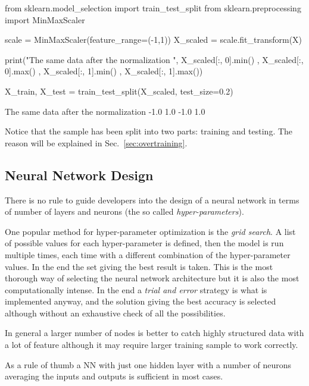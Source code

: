 \begin{ipython}
from sklearn.model_selection import train_test_split
from sklearn.preprocessing import MinMaxScaler

scale = MinMaxScaler(feature_range=(-1,1))
X_scaled = scale.fit_transform(X)

print("The same data after the normalization ", X_scaled[:, 0].min()
                                              , X_scaled[:, 0].max()
                                              , X_scaled[:, 1].min()
                                              , X_scaled[:, 1].max())

X_train, X_test = train_test_split(X_scaled, test_size=0.2)
\end{ipython}
\begin{ioutput}
The same data after the normalization  -1.0 1.0 -1.0 1.0
\end{ioutput}

Notice that the sample has been split into two parts: training and testing. The reason will be explained in Sec.~\ref{sec:overtraining}.

\subsection{Neural Network Design}
\label{neural-network-design}

There is no rule to guide developers into the design of a neural network in terms of number of layers and neurons (the so called \emph{hyper-parameters}). 

One popular method for hyper-parameter optimization is the \emph{grid search}. 
A list of possible values for each hyper-parameter is defined, then the model is run multiple times, each time with a different combination of the hyper-parameter values. In the end the set giving the best result is taken. This is the most thorough way of selecting the neural network architecture but it is also the most computationally intense.
In the end a \emph{trial and error} strategy is what is implemented anyway, and the solution giving the best accuracy is selected although without an exhaustive check of all the possibilities.

In general a larger number of nodes is better to catch highly structured data with a lot of feature although it may require larger training sample to work correctly.

As a rule of thumb a NN with just one hidden layer with a number of neurons averaging the inputs and outputs is sufficient in most cases.

